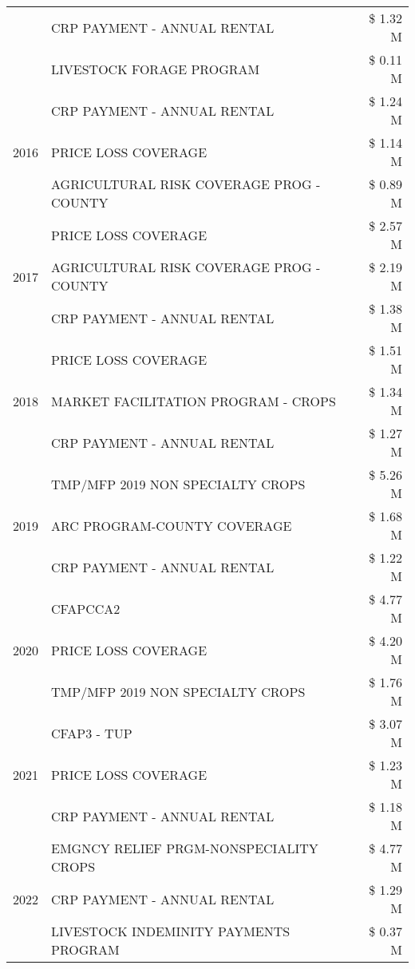\begin{tabular}{llr}
 & CRP PAYMENT - ANNUAL RENTAL & \$ 1.32 M \\
 & LIVESTOCK FORAGE PROGRAM & \$ 0.11 M \\
\cline{1-3}
\multirow[t]{3}{*}{2016} & CRP PAYMENT - ANNUAL RENTAL & \$ 1.24 M \\
 & PRICE LOSS COVERAGE & \$ 1.14 M \\
 & AGRICULTURAL RISK COVERAGE PROG - COUNTY & \$ 0.89 M \\
\cline{1-3}
\multirow[t]{3}{*}{2017} & PRICE LOSS COVERAGE & \$ 2.57 M \\
 & AGRICULTURAL RISK COVERAGE PROG - COUNTY & \$ 2.19 M \\
 & CRP PAYMENT - ANNUAL RENTAL & \$ 1.38 M \\
\cline{1-3}
\multirow[t]{3}{*}{2018} & PRICE LOSS COVERAGE & \$ 1.51 M \\
 & MARKET FACILITATION PROGRAM - CROPS & \$ 1.34 M \\
 & CRP PAYMENT - ANNUAL RENTAL & \$ 1.27 M \\
\cline{1-3}
\multirow[t]{3}{*}{2019} & TMP/MFP 2019 NON SPECIALTY CROPS & \$ 5.26 M \\
 & ARC PROGRAM-COUNTY COVERAGE & \$ 1.68 M \\
 & CRP PAYMENT - ANNUAL RENTAL & \$ 1.22 M \\
\cline{1-3}
\multirow[t]{3}{*}{2020} & CFAPCCA2 & \$ 4.77 M \\
 & PRICE LOSS COVERAGE & \$ 4.20 M \\
 & TMP/MFP 2019 NON SPECIALTY CROPS & \$ 1.76 M \\
\cline{1-3}
\multirow[t]{3}{*}{2021} & CFAP3 - TUP & \$ 3.07 M \\
 & PRICE LOSS COVERAGE & \$ 1.23 M \\
 & CRP PAYMENT - ANNUAL RENTAL & \$ 1.18 M \\
\cline{1-3}
\multirow[t]{3}{*}{2022} & EMGNCY RELIEF PRGM-NONSPECIALITY CROPS & \$ 4.77 M \\
 & CRP PAYMENT - ANNUAL RENTAL & \$ 1.29 M \\
 & LIVESTOCK INDEMINITY PAYMENTS PROGRAM & \$ 0.37 M \\
\cline{1-3}
\bottomrule
\end{tabular}
